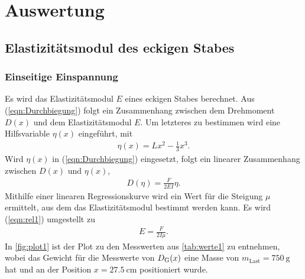 \section{Auswertung}
\label{sec:Auswertung}

\subsection{Elastizitätsmodul des eckigen Stabes}
\label{subsec:elastiEckig}

\subsubsection{Einseitige Einspannung}
\label{subsubsec:einsEck}
Es wird das Elastizitätsmodul $E$ eines eckigen Stabes berechnet.
Aus (\ref{eqn:Durchbiegung}) folgt ein Zusammenhang zwischen dem Drehmoment $D(x)$ und dem Elastizitätsmodul $E$. Um letzteres zu bestimmen
wird eine Hilfsvariable $\eta(x)$ eingeführt, mit 
\begin{align}
  \eta(x) = Lx^2- \frac 13 x^3.
  \label{eqn:eta1}
\end{align}
Wird $\eta(x)$ in (\ref{eqn:Durchbiegung}) eingesetzt, folgt ein linearer Zusammenhang zwischen $D(x)$ und $\eta(x)$,
\begin{align}
  D(\eta) = \frac{F}{2EI}\eta.
  \label{eqn:rel1}
\end{align}
Mithilfe einer linearen Regressionskurve wird ein Wert für die Steigung $\mu$ ermittelt, aus dem das Elastizitätsmodul bestimmt
werden kann. Es wird (\ref{eqn:rel1}) umgestellt zu
\begin{align}
  E = \frac{F}{2I\mu}.
  \label{eqn:linRegq}
\end{align}
In \autoref{fig:plot1} ist der Plot zu den Messwerten 
aus \autoref{tab:werte1} zu entnehmen, wobei das Gewicht für die Messwerte von $D_{\text G}(x)$ eine Masse von 
$m_{\text{Last}}=\SI{750}{\gram}$ hat und an der Position $x = \SI{27.5}{\centi\meter}$ positioniert wurde.  


